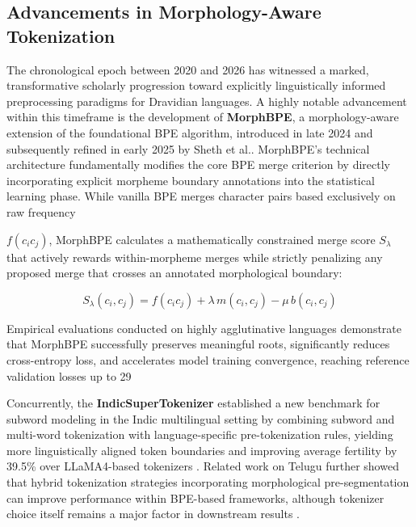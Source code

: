 \documentclass[12pt]{article}
\begin{document}
	
	
	\subsection{Advancements in Morphology-Aware Tokenization}
	
	The chronological epoch between 2020 and 2026 has witnessed a marked, transformative scholarly progression toward explicitly linguistically informed preprocessing paradigms for Dravidian languages. A highly notable advancement within this timeframe is the development of \textbf{MorphBPE}, a morphology-aware extension of the foundational BPE algorithm, introduced in late 2024 and subsequently refined in early 2025 by Sheth et al.. MorphBPE's technical architecture fundamentally modifies the core BPE merge criterion by directly incorporating explicit morpheme boundary annotations into the statistical learning phase. While vanilla BPE merges character pairs based exclusively on raw frequency 
	
	$f(c_i c_j)$, MorphBPE calculates a mathematically constrained merge score 
	$S_{\lambda}$ that actively rewards within-morpheme merges while strictly 
	penalizing any proposed merge that crosses an annotated morphological boundary:
	
	\begin{equation}
		S_{\lambda}(c_i, c_j) = f(c_i c_j) + \lambda\, m(c_i, c_j) - \mu\, b(c_i, c_j)
	\end{equation}
	
	Empirical evaluations conducted on highly agglutinative languages demonstrate that MorphBPE successfully preserves meaningful roots, significantly reduces cross-entropy loss, and accelerates model training convergence, reaching reference validation losses up to 29%
	
	Concurrently, the \textbf{IndicSuperTokenizer} established a new benchmark for subword modeling in the Indic multilingual setting by combining subword and multi-word tokenization with language-specific pre-tokenization rules, yielding more linguistically aligned token boundaries and improving average fertility by 39.5\% over LLaMA4-based tokenizers \cite{rana2025indicsupertokenizer}. Related work on Telugu further showed that hybrid tokenization strategies incorporating morphological pre-segmentation can improve performance within BPE-based frameworks, although tokenizer choice itself remains a major factor in downstream results \cite{vemula2025rethinking}. 
	
\end{document}
